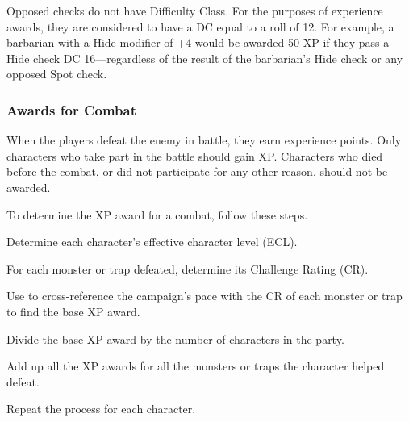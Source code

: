 Opposed checks do not have Difficulty Class. For the purposes of experience awards, they are considered to have a DC equal to a roll of 12. For example, a barbarian with a Hide modifier of +4 would be awarded 50 XP if they pass a Hide check DC 16---regardless of the result of the barbarian's Hide check or any opposed Spot check.


\subsubsection{Awards for Combat}
When the players defeat the enemy in battle, they earn experience points. Only characters who take part in the battle should gain XP. Characters who died before the combat, or did not participate for any other reason, should not be awarded.

To determine the XP award for a combat, follow these steps.
\begin{enumerate*}
	\item Determine each character's effective character level (ECL).
	\item For each monster or trap defeated, determine its Challenge Rating (CR).
	\item Use  to cross-reference the campaign's pace with the CR of each monster or trap to find the base XP award.
	\item Divide the base XP award by the number of characters in the party.
	\item Add up all the XP awards for all the monsters or traps the character helped defeat.
	\item Repeat the process for each character.
\end{enumerate*}


